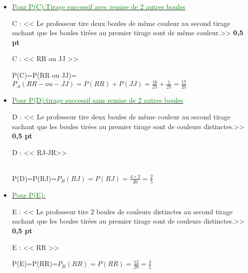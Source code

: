 \documentclass[12pt]{article}
\begin{document}
\begin{itemize}
\item \underline{\textcolor{green}{Pour P(C):Tirage successif avec remise de 2 autres boules}}

C : << Le professeur tire deux boules de même couleur au second tirage sachant que les boules tirées au premier tirage sont de même couleur.>>  \textbf{0,5 pt}

C : << RR ou JJ >>

P(C)=P(RR ou JJ)=$P_{A}({RR-ou-JJ})=P(RR)+P(JJ)=\frac{16}{25}+\frac{1}{25}=\frac{17}{25}$

		\begin{center}
			\textcolor{green}{}
		\end{center}

\item \underline{\textcolor{green}{Pour P(D):tirage successif sans remise de 2 autres boules}}

D : << Le professeur tire deux boules de même couleur au second tirage sachant que les boules tirées au premier tirage sont de couleurs distinctes.>> \textbf{0,5 pt}

D : << RJ-JR>> 

\\ 

P(D)=P(RJ)=$P_{B}({RJ})=P(RJ)=\frac{4\times 2}{20}=\frac{2}{5}$

		\begin{center}
			\textcolor{green}{}
		\end{center}

\item \underline{\textcolor{green}{Pour P(E):}}

E : << Le professeur tire 2 boules de couleurs distinctes au second tirage sachant que les boules tirées au premier tirage sont de couleurs distinctes.>> \textbf{0,5 pt}

E : << RR >>

P(E)=P(RR)=$P_{B}({RR})=P(RR)=\frac{12}{20}=\frac{3}{5}$

		\begin{center}
			\textcolor{green}{}
		\end{center}


\end{itemize}
\end{document}
